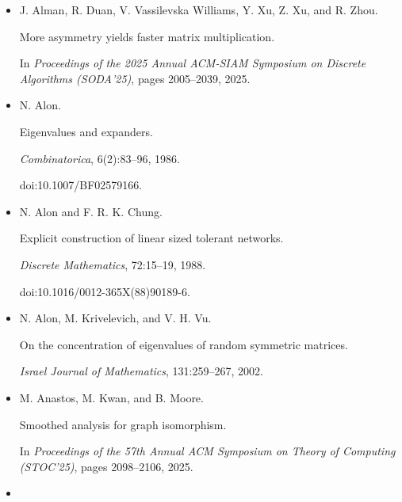 \documentclass[10pt,a4paper]{article}
\begin{document}
\begin{itemize}


\item[] 
[1]

J. Alman, R. Duan, V. Vassilevska Williams, Y. Xu, Z. Xu, and R. Zhou.


More asymmetry yields faster matrix multiplication.


In \emph{Proceedings of the 2025 Annual ACM-SIAM Symposium on Discrete
Algorithms (SODA’25)}, pages 2005–2039, 2025.





\item[] 
[2]

N. Alon.


Eigenvalues and expanders.


\emph{Combinatorica}, 6(2):83–96, 1986.


doi:10.1007/BF02579166.





\item[] 
[3]

N. Alon and F. R. K. Chung.


Explicit construction of linear sized tolerant networks.


\emph{Discrete Mathematics}, 72:15–19, 1988.


doi:10.1016/0012-365X(88)90189-6.





\item[] 
[4]

N. Alon, M. Krivelevich, and V. H. Vu.


On the concentration of eigenvalues of random symmetric matrices.


\emph{Israel Journal of Mathematics}, 131:259–267, 2002.





\item[] 
[5]

M. Anastos, M. Kwan, and B. Moore.


Smoothed analysis for graph isomorphism.


In \emph{Proceedings of the 57th Annual ACM Symposium on Theory of
Computing (STOC’25)}, pages 2098–2106, 2025.





\item[] 
[6]


\end{itemize}
\end{document}
